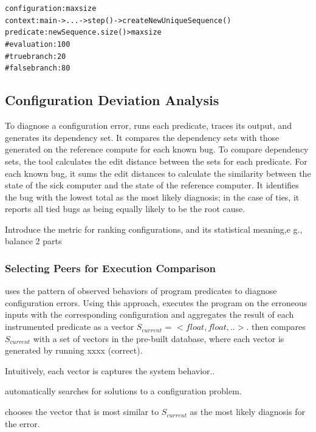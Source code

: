 
\begin{CodeOut}
\begin{alltt}
configuration: maxsize
context: main -> ... -> step() - > createNewUniqueSequence()
predicate: newSequence.size() > maxsize
    \# evaluation: 100
    \# true branch: 20
    \# false branch: 80
\end{alltt}
\end{CodeOut}

\subsection{Configuration Deviation Analysis}
\label{sec:analysis}

To diagnose a configuration error, \ourtool runs each predicate, traces its
output, and generates its dependency set. It compares the dependency sets
with those generated on the reference compute for each known bug. To compare
dependency sets, the tool calculates the edit distance between the sets
for each predicate. For each known bug, it sums the edit
distances to calculate the similarity between the state of the sick
computer and the state of the reference computer. It identifies the bug
with the lowest total as the most likely diagnosis; in the case of ties,
it reports all tied bugs as being equally likely to be the root cause.

Introduce the metric for ranking configurations, and its
statistical meaning,e g., balance 2 parts


\subsubsection{Selecting Peers for Execution Comparison}

\ourtool uses the pattern of observed behaviors of program predicates
to diagnose configuration errors. Using this approach, \ourtool
executes the program on the erroneous inputs with the
corresponding configuration and aggregates the result of
each instrumented predicate as a vector $S_{current}$ = $<float, float, ..>$.
\ourtool then compares $S_{current}$ with a set of
vectors in the pre-built database, where each vector is generated
by running xxxx (correct).

Intuitively, each vector is captures the system behavior..

\ourtool automatically searches for solutions to a configuration
problem.

\ourtool chooses the vector that is most similar to $S_{current}$ as
the most likely diagnosis for the error.

